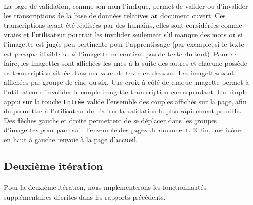 \paragraph{}
La page de validation, comme son nom l’indique, permet de valider ou d’invalider les transcriptions de la base de données relatives au document ouvert. Ces transcriptions ayant été réalisées par des humains, elles sont considérées comme vraies et l’utilisateur pourrait les invalider seulement s’il manque des mots ou si l’imagette est jugée peu pertinente pour l’apprentissage (par exemple, si le texte est presque illisible ou si l’imagette ne contient pas de texte du tout). Pour ce faire, les imagettes sont affichées les unes à la suite des autres et chacune possède sa transcription située dans une zone de texte en dessous. Les imagettes sont affichées par groupe de cinq ou six. Une croix à côté de chaque imagette permet à l’utilisateur d’invalider le couple imagette-transcription correspondant. Un simple appui sur la touche \texttt{Entrée} valide l’ensemble des couples affichés sur la page, afin de permettre à l’utilisateur de réaliser la validation le plus rapidement possible. Des flèches gauche et droite permettent de se déplacer dans les groupes d’imagettes pour parcourir l’ensemble des pages du document. Enfin, une icône en haut à gauche renvoie à la page d’accueil.


\subsection{Deuxième itération}

\paragraph{}
Pour la deuxième itération, nous implémenterons les fonctionnalités supplémentaires décrites dans les rapports précédents.

